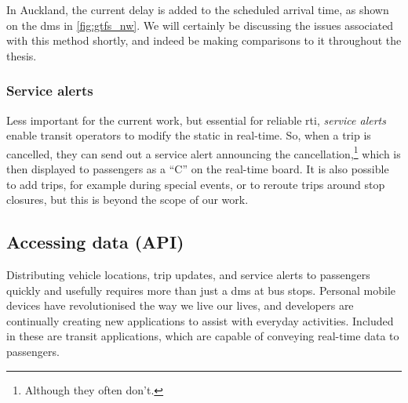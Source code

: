 In Auckland, the current delay is added to the scheduled arrival time, as shown on the \gls{dms} in \cref{fig:gtfs_nw}. We will certainly be discussing the issues associated with this method shortly, and indeed be making comparisons to it throughout the thesis.



\subsubsection{Service alerts}
\label{sec:gtfs_rt_alerts}

Less important for the current work, but essential for reliable \gls{rti}, \emph{service alerts} enable transit operators to modify the static \GTFS{} in real-time. So, when a trip is cancelled, they can send out a service alert announcing the cancellation,\footnote{Although they often don't.} which is then displayed to passengers as a ``C'' on the real-time board. It is also possible to add trips, for example during special events, or to reroute trips around stop closures, but this is beyond the scope of our work.



\subsection{Accessing \rt{} data (API)}
\label{sec:gtfs_rt_api}

Distributing vehicle locations, trip updates, and service alerts to passengers quickly and usefully requires more than just a \gls{dms} at bus stops. Personal mobile devices have revolutionised the way we live our lives, and developers are continually creating new applications to assist with everyday activities. Included in these are transit applications, which are capable of conveying real-time \GTFS{} data to passengers.


